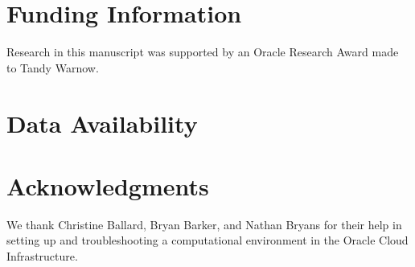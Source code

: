 \documentclass[11pt]{article}   	%
\begin{document}
\section*{Funding Information} Research in this manuscript was supported by an Oracle Research Award made to Tandy Warnow. 

\section*{Data Availability}

\section*{Acknowledgments} We thank Christine Ballard, Bryan Barker, and Nathan Bryans for their help in setting up and troubleshooting a computational environment in the Oracle Cloud Infrastructure. 



\end{document}
